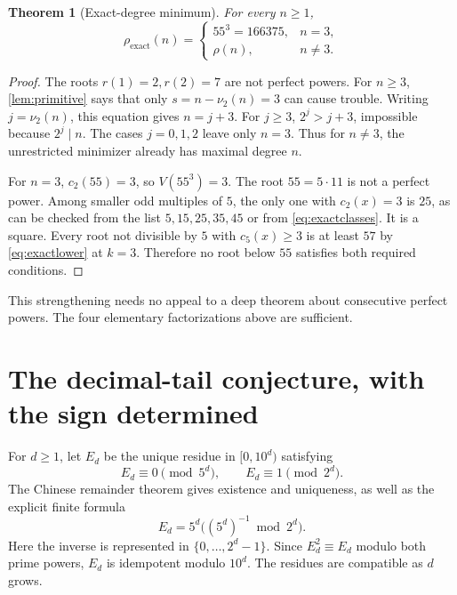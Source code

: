 \documentclass[11pt,a4paper]{article}
\newtheorem{theorem}{Theorem}[section]
\theoremstyle{definition}
\begin{document}
\begin{theorem}[Exact-degree minimum]
\label{thm:strict}
For every $n\ge1$,
\begin{equation}
\rho_{\mathrm{exact}}(n)=
\begin{cases}
55^3=166375,&n=3,\\
\rho(n),&n\ne3.
\end{cases}
\label{eq:strict}
\end{equation}
\end{theorem}
\begin{proof}
The roots $r(1)=2,r(2)=7$ are not perfect powers. For $n\ge3$,
\cref{lem:primitive} says that only $s=n-\nu_2(n)=3$ can cause trouble.
Writing $j=\nu_2(n)$, this equation gives $n=j+3$. For $j\ge3$,
$2^j>j+3$, impossible because $2^j\mid n$. The cases $j=0,1,2$ leave
only $n=3$. Thus for $n\ne3$, the unrestricted minimizer already has
maximal degree $n$.

For $n=3$, $c_2(55)=3$, so $V(55^3)=3$. The root $55=5\cdot11$ is not
a perfect power. Among smaller odd multiples of $5$, the only one with
$c_2(x)=3$ is $25$, as can be checked from the list
$5,15,25,35,45$ or from \eqref{eq:exactclasses}. It is a square.
Every root not divisible by $5$ with $c_5(x)\ge3$ is at least $57$ by
\eqref{eq:exactlower} at $k=3$. Therefore no root below $55$ satisfies
both required conditions.
\end{proof}

This strengthening needs no appeal to a deep theorem about consecutive
perfect powers. The four elementary factorizations above are sufficient.

\section{The decimal-tail conjecture, with the sign determined}
\label{sec:tails}

For $d\ge1$, let $E_d$ be the unique residue in $[0,10^d)$ satisfying
\begin{equation}
E_d\equiv0\pmod{5^d},\qquad E_d\equiv1\pmod{2^d}.
\label{eq:Ed}
\end{equation}
The Chinese remainder theorem gives existence and uniqueness, as well as
the explicit finite formula
\begin{equation}
E_d=5^d\bigl((5^d)^{-1}\bmod2^d\bigr).
\label{eq:Edformula}
\end{equation}
Here the inverse is represented in $\{0,\ldots,2^d-1\}$.
Since $E_d^2\equiv E_d$ modulo both prime powers, $E_d$ is idempotent
modulo $10^d$. The residues are compatible as $d$ grows.
\end{document}
